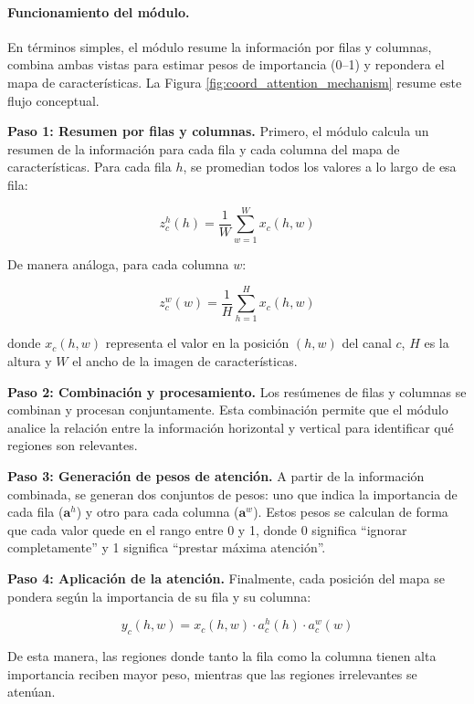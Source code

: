\paragraph{Funcionamiento del módulo.}
En términos simples, el módulo resume la información por filas y columnas, combina ambas
vistas para estimar pesos de importancia (0--1) y repondera el mapa de características.
La Figura \ref{fig:coord_attention_mechanism} resume este flujo conceptual.

\textbf{Paso 1: Resumen por filas y columnas.} Primero, el módulo calcula un resumen de la
información para cada fila y cada columna del mapa de características. Para cada fila $h$,
se promedian todos los valores a lo largo de esa fila:

\begin{equation}
    z_c^h(h) = \frac{1}{W} \sum_{w=1}^{W} x_c(h, w)
\end{equation}

De manera análoga, para cada columna $w$:

\begin{equation}
    z_c^w(w) = \frac{1}{H} \sum_{h=1}^{H} x_c(h, w)
\end{equation}

\noindent donde $x_c(h, w)$ representa el valor en la posición $(h, w)$ del canal $c$, $H$ es la altura y $W$ el ancho de la imagen de características.

\textbf{Paso 2: Combinación y procesamiento.} Los resúmenes de filas y columnas se combinan
y procesan conjuntamente. Esta combinación permite que el módulo analice la relación
entre la información horizontal y vertical para identificar qué regiones son relevantes.

\textbf{Paso 3: Generación de pesos de atención.} A partir de la información combinada, se
generan dos conjuntos de pesos: uno que indica la importancia de cada fila ($\mathbf{a}^h$)
y otro para cada columna ($\mathbf{a}^w$). Estos pesos se calculan de forma que cada valor
quede en el rango entre 0 y 1, donde 0 significa ``ignorar completamente'' y 1 significa
``prestar máxima atención''.

\textbf{Paso 4: Aplicación de la atención.} Finalmente, cada posición del mapa se pondera
según la importancia de su fila y su columna:

\begin{equation}
    y_c(h, w) = x_c(h, w) \cdot a_c^h(h) \cdot a_c^w(w)
\end{equation}

De esta manera, las regiones donde tanto la fila como la columna tienen alta importancia reciben mayor peso, mientras que las regiones irrelevantes se atenúan.

